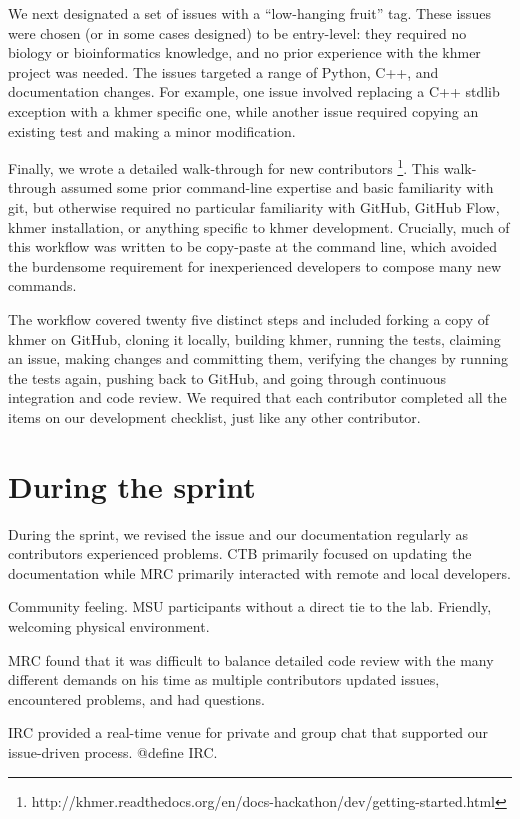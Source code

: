 \documentclass[12pt]{article}
\begin{document}
We next designated a set of issues with a ``low-hanging fruit'' tag.
These issues were chosen (or in some cases designed) to be
entry-level: they required no biology or bioinformatics knowledge, and
no prior experience with the khmer project was needed.  The issues
targeted a range of Python, C++, and documentation changes.  For
example, one issue involved replacing a C++ stdlib exception with a
khmer specific one, while another issue required copying an existing
test and making a minor modification.

Finally, we wrote a detailed walk-through for new contributors
\footnote{http://khmer.readthedocs.org/en/docs-hackathon/dev/getting-started.html}.
This walk-through assumed some prior command-line expertise and basic
familiarity with git, but otherwise required no particular familiarity
with GitHub, GitHub Flow, khmer installation, or anything specific to
khmer development.  Crucially, much of this workflow was written to be
copy-paste at the command line, which avoided the burdensome
requirement for inexperienced developers to compose many new commands.

The workflow covered twenty five distinct steps and included forking a
copy of khmer on GitHub, cloning it locally, building khmer, running
the tests, claiming an issue, making changes and committing them,
verifying the changes by running the tests again, pushing back to
GitHub, and going through continuous integration and code review.  We
required that each contributor completed all the items on our
development checklist, just like any other contributor.

\section{During the sprint}

During the sprint, we revised the issue and our documentation regularly
as contributors experienced problems.  CTB primarily focused on updating
the documentation while MRC primarily interacted with remote and local
developers.

Community feeling.  MSU participants without a direct tie to the lab.
Friendly, welcoming physical environment.

MRC found that it was difficult to balance detailed code review with
the many different demands on his time as multiple contributors updated
issues, encountered problems, and had questions.

IRC provided a real-time venue for private and group chat that supported
our issue-driven process.
@define IRC.
\end{document}
